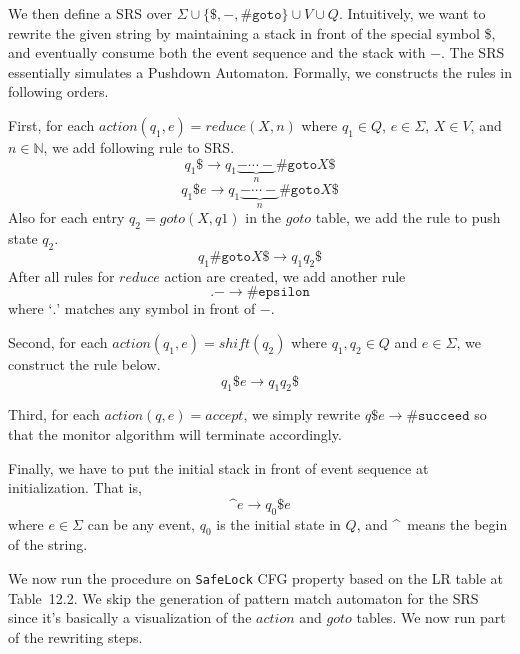 \documentclass{article}
\begin{document}
\begin{enumerate}
We then define a SRS over $\Sigma \cup \{\$, -, \texttt{\#goto}\} \cup V \cup Q$.
Intuitively, we want to rewrite the given string by maintaining a stack in front
of the special symbol \$,
and eventually consume both the event sequence and the stack with $-$.
The SRS essentially simulates a Pushdown Automaton.
Formally, we constructs the rules in following orders.

First, for each $action(q_1, e) = reduce(X, n)$ where $q_1 \in Q$,
$e \in \Sigma$, $X \in V$, and $n \in \mathbb{N}$, we add following rule to SRS.
$$
    q_1\$ \to q_1 \underbrace{- \cdots -}_{n} \texttt{\#goto} X\$
$$$$
    q_1\$e \to q_1 \underbrace{- \cdots -}_{n} \texttt{\#goto} X\$
$$
Also for each entry $q_2 = goto(X, q1)$ in the $goto$ table,
we add the rule to push state $q_2$.
$$
    q_1 \texttt{\#goto} X \$ \to q_1 q_2 \$
$$
After all rules for $reduce$ action are created, we add another rule
$$
    . - \to \texttt{\#epsilon}
$$
where `$.$' matches any symbol in front of $-$.

Second, for each $action(q_1, e) = shift(q_2)$ where $q_1, q_2 \in Q$ and
$e \in \Sigma$, we construct the rule below.
$$
   q_1\$e \to q_1 q_2\$
$$

Third, for each $action(q, e) = accept$, we simply rewrite
$
    q \$ e \to \texttt{\#succeed}
$
so that the monitor algorithm will terminate accordingly.

Finally, we have to put the initial stack in front of event sequence at initialization.
That is,
$$
    \text{\textasciicircum} e \to q_0 \$ e
$$
where $e \in \Sigma$ can be any event, $q_0$ is the initial state in $Q$,
and \textasciicircum\ means the begin of the string.

We now run the procedure on \texttt{SafeLock} CFG property based on the LR table
at Table~12.2.
We skip the generation of pattern match automaton for the SRS since it's
basically a visualization of the $action$ and $goto$ tables.
We now run part of the rewriting steps. 


\end{enumerate}
\end{document}
